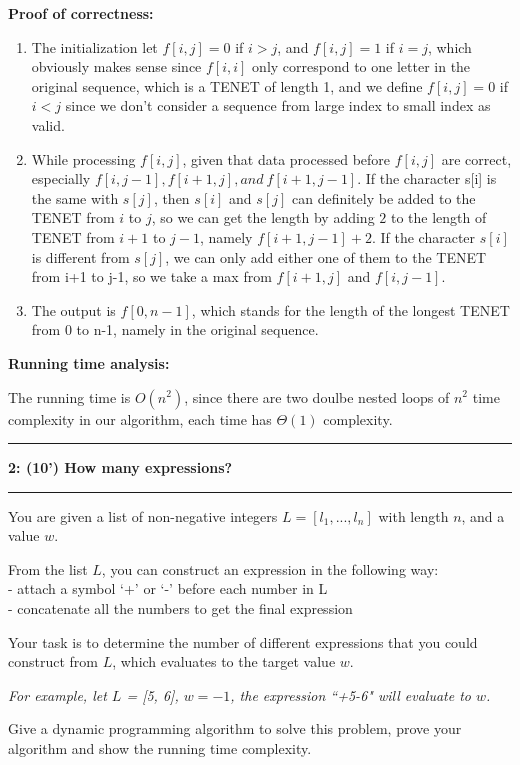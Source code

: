 \documentclass{article}
\newcommand\question[2]{\vspace{.25in}\hrule\textbf{#1: #2}\vspace{.5em}\hrule\vspace{.10in}}
\begin{document}
\textbf{Proof of correctness:}
\begin{enumerate}
	\item The initialization let $f[i,j]=0$ if $i>j$, and $f[i,j]=1$ if $i=j$, which obviously makes sense since $f[i,i]$ only correspond to one letter in the original sequence, which is a TENET of length 1, and we define $f[i,j]=0$ if $i<j$ since we don’t consider a sequence from large index to small index as valid.
	\item While processing $f[i,j]$, given that data processed before $f[i,j]$ are correct, especially $f[i,j-1],f[i+1,j],and~f[i+1,j-1]$. If the character s[i] is the same with $s[j]$, then $s[i]$ and $s[j]$ can definitely be added to the TENET from $i$ to $j$, so we can get the length by adding $2$ to the length of TENET from $i+1$ to $j-1$, namely $f[i+1,j-1]+2$.
	      If the character $s[i]$ is different from $s[j]$, we can only add either one of them to the TENET from i+1 to j-1, so we take a max from $f[i+1,j]$ and $f[i,j-1]$.
	\item The output is $f[0,n-1]$, which stands for the length of the longest TENET from 0 to n-1, namely in the original sequence.
\end{enumerate}

\textbf{Running time analysis:}

The running time is $O(n^2)$, since there are two doulbe nested loops of $n^2$ time complexity in our algorithm, each time has $\Theta(1)$ complexity.

\pagebreak


\question{2}{(10') How many expressions?}
You are given a list of non-negative integers $L=[l_1,...,l_n]$ with length $n$, and a value $w$.

From the list $L$, you can construct an expression in the following way:\\
\hspace*{0.5cm}- attach a symbol `+' or `-' before each number in L\\
\hspace*{0.5cm}- concatenate all the numbers to get the final expression

Your task is to determine the number of different expressions that you could construct from $L$, which evaluates to the target value $w$.

\textit{For example, let $L$ = [5, 6], $w=-1$, the expression ``+5-6" will evaluate to $w$.}

Give a dynamic programming algorithm to solve this problem, prove your algorithm and show the running
time complexity.
\end{document}
